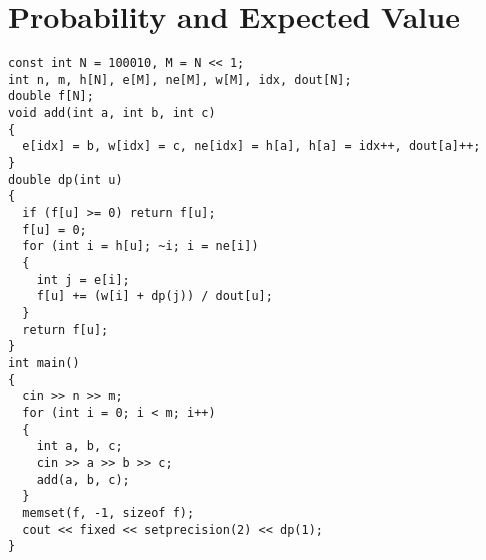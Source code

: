 \section{Probability and Expected Value}
\begin{lstlisting}
const int N = 100010, M = N << 1;
int n, m, h[N], e[M], ne[M], w[M], idx, dout[N];
double f[N];
void add(int a, int b, int c)
{
  e[idx] = b, w[idx] = c, ne[idx] = h[a], h[a] = idx++, dout[a]++;
}
double dp(int u)
{
  if (f[u] >= 0) return f[u];
  f[u] = 0;
  for (int i = h[u]; ~i; i = ne[i])
  {
    int j = e[i];
    f[u] += (w[i] + dp(j)) / dout[u];
  }
  return f[u];
}
int main()
{
  cin >> n >> m;
  for (int i = 0; i < m; i++)
  {
    int a, b, c;
    cin >> a >> b >> c;
    add(a, b, c);
  }
  memset(f, -1, sizeof f);
  cout << fixed << setprecision(2) << dp(1);
}
\end{lstlisting}
